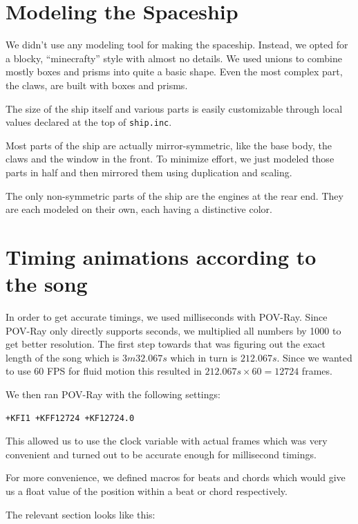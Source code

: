 \documentclass[a4paper, 12pt]{scrartcl}
\begin{document}
    \section{Modeling the Spaceship}
    \label{sec:ship}

    We didn't use any modeling tool for making the spaceship. Instead, we opted for a blocky, ``minecrafty'' style with almost no details. We used unions to combine mostly boxes and prisms into quite a basic shape. Even the most complex part, the claws, are built with boxes and prisms.

    The size of the ship itself and various parts is easily customizable through local values declared at the top of \texttt{ship.inc}.

    Most parts of the ship are actually mirror-symmetric, like the base body, the claws and the window in the front. To minimize effort, we just modeled those parts in half and then mirrored them using duplication and scaling.

    The only non-symmetric parts of the ship are the engines at the rear end. They are each modeled on their own, each having a distinctive color.

    \section{Timing animations according to the song}

    In order to get accurate timings, we used milliseconds with POV-Ray. Since POV-Ray only
    directly supports seconds, we multiplied all numbers by 1000 to get better resolution.
    The first step towards that was figuring out the exact length of the song which is
    \(3m32.067s\) which in turn is \(212.067s\). Since we wanted to use 60 FPS for fluid motion
    this resulted in \(212.067s \times 60 = 12724\) frames. 

    We then ran POV-Ray with the following settings:
    \begin{verbatim}+KFI1 +KFF12724 +KF12724.0\end{verbatim}
    This allowed us to use the \texttt clock variable with actual frames which was very convenient
    and turned out to be accurate enough for millisecond timings.

    For more convenience, we defined macros for beats and chords which would give us a float value
    of the position within a beat or chord respectively.

    The relevant section looks like this:
\end{document}
